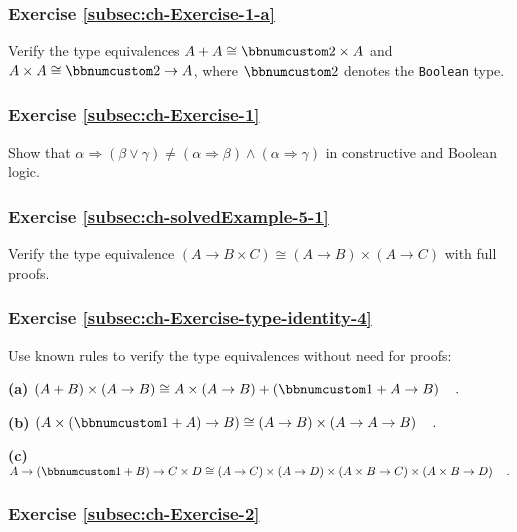 \subsubsection{Exercise \label{subsec:ch-Exercise-1-a}\ref{subsec:ch-Exercise-1-a}}

Verify the type equivalences $A+A\cong\bbnum 2\times A$ and $A\times A\cong\bbnum 2\rightarrow A$,
where $\bbnum 2$ denotes the \lstinline!Boolean! type.

\subsubsection{Exercise \label{subsec:ch-Exercise-1}\ref{subsec:ch-Exercise-1}}

Show that $\alpha\Rightarrow(\beta\vee\gamma)\neq(\alpha\Rightarrow\beta)\wedge(\alpha\Rightarrow\gamma)$
in constructive and Boolean logic.

\subsubsection{Exercise \label{subsec:ch-solvedExample-5-1}\ref{subsec:ch-solvedExample-5-1}}

Verify the type equivalence $\left(A\rightarrow B\times C\right)\cong\left(A\rightarrow B\right)\times\left(A\rightarrow C\right)$
with full proofs.

\subsubsection{Exercise \label{subsec:ch-Exercise-type-identity-4}\ref{subsec:ch-Exercise-type-identity-4}}

Use known rules to verify the type equivalences without need for proofs:

\textbf{(a)} $\left(A+B\right)\times\left(A\rightarrow B\right)\cong A\times\left(A\rightarrow B\right)+\left(\bbnum 1+A\rightarrow B\right)\quad.$

\textbf{(b)} $\left(A\times(\bbnum 1+A)\rightarrow B\right)\cong\left(A\rightarrow B\right)\times\left(A\rightarrow A\rightarrow B\right)\quad.$

\textbf{(c)} $A\rightarrow\left(\bbnum 1+B\right)\rightarrow C\times D\cong\left(A\rightarrow C\right)\times\left(A\rightarrow D\right)\times\left(A\times B\rightarrow C\right)\times\left(A\times B\rightarrow D\right)\quad.$

\subsubsection{Exercise \label{subsec:ch-Exercise-2}\ref{subsec:ch-Exercise-2}}

